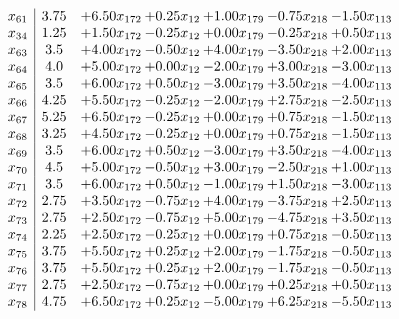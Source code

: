 \documentclass[8pt]{article}
\begin{document}
\[\begin{array}{c| c c@{\hskip 2pt} c@{\hskip 2pt} c@{\hskip 2pt} c@{\hskip 2pt} c@{\hskip 2pt} }
 x_{61}   &  3.75 & +  6.50 x_{172} & +  0.25 x_{12} & +  1.00 x_{179} & -0.75 x_{218} & -1.50 x_{113}\\
 x_{34}   &  1.25 & +  1.50 x_{172} & -0.25 x_{12} & +  0.00 x_{179} & -0.25 x_{218} & +  0.50 x_{113}\\
 x_{63}   &  3.5 & +  4.00 x_{172} & -0.50 x_{12} & +  4.00 x_{179} & -3.50 x_{218} & +  2.00 x_{113}\\
 x_{64}   &  4.0 & +  5.00 x_{172} & +  0.00 x_{12} & -2.00 x_{179} & +  3.00 x_{218} & -3.00 x_{113}\\
 x_{65}   &  3.5 & +  6.00 x_{172} & +  0.50 x_{12} & -3.00 x_{179} & +  3.50 x_{218} & -4.00 x_{113}\\
 x_{66}   &  4.25 & +  5.50 x_{172} & -0.25 x_{12} & -2.00 x_{179} & +  2.75 x_{218} & -2.50 x_{113}\\
 x_{67}   &  5.25 & +  6.50 x_{172} & -0.25 x_{12} & +  0.00 x_{179} & +  0.75 x_{218} & -1.50 x_{113}\\
 x_{68}   &  3.25 & +  4.50 x_{172} & -0.25 x_{12} & +  0.00 x_{179} & +  0.75 x_{218} & -1.50 x_{113}\\
 x_{69}   &  3.5 & +  6.00 x_{172} & +  0.50 x_{12} & -3.00 x_{179} & +  3.50 x_{218} & -4.00 x_{113}\\
 x_{70}   &  4.5 & +  5.00 x_{172} & -0.50 x_{12} & +  3.00 x_{179} & -2.50 x_{218} & +  1.00 x_{113}\\
 x_{71}   &  3.5 & +  6.00 x_{172} & +  0.50 x_{12} & -1.00 x_{179} & +  1.50 x_{218} & -3.00 x_{113}\\
 x_{72}   &  2.75 & +  3.50 x_{172} & -0.75 x_{12} & +  4.00 x_{179} & -3.75 x_{218} & +  2.50 x_{113}\\
 x_{73}   &  2.75 & +  2.50 x_{172} & -0.75 x_{12} & +  5.00 x_{179} & -4.75 x_{218} & +  3.50 x_{113}\\
 x_{74}   &  2.25 & +  2.50 x_{172} & -0.25 x_{12} & +  0.00 x_{179} & +  0.75 x_{218} & -0.50 x_{113}\\
 x_{75}   &  3.75 & +  5.50 x_{172} & +  0.25 x_{12} & +  2.00 x_{179} & -1.75 x_{218} & -0.50 x_{113}\\
 x_{76}   &  3.75 & +  5.50 x_{172} & +  0.25 x_{12} & +  2.00 x_{179} & -1.75 x_{218} & -0.50 x_{113}\\
 x_{77}   &  2.75 & +  2.50 x_{172} & -0.75 x_{12} & +  0.00 x_{179} & +  0.25 x_{218} & +  0.50 x_{113}\\
 x_{78}   &  4.75 & +  6.50 x_{172} & +  0.25 x_{12} & -5.00 x_{179} & +  6.25 x_{218} & -5.50 x_{113}\\

\end{array}\]
\end{document}

